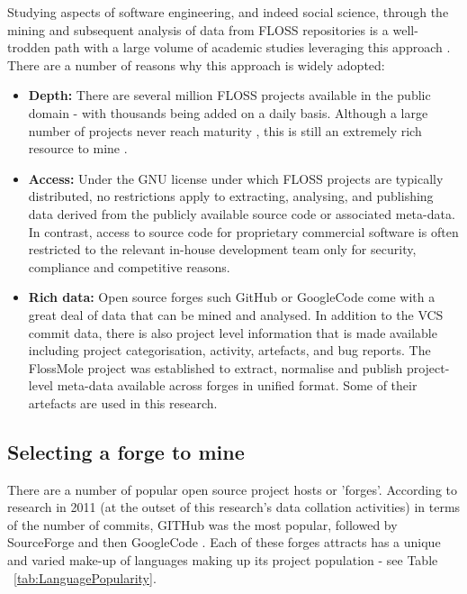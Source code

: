 Studying aspects of software engineering, and indeed social science, through the mining and subsequent analysis of data from FLOSS repositories is a well-trodden path with a large volume of academic studies leveraging this approach \citep{hassan2008road, hemmati2013msr}. There are a number of reasons why this approach is widely adopted:

\begin{itemize}
\item \textbf{Depth:} There are several million FLOSS projects available in the public domain - with thousands being added on a daily basis. Although a large number of projects never reach maturity \citep{comino2005planning}, this is still an extremely rich resource to mine \citep{deshpande2008total}.
\item \textbf{Access:} Under the GNU \citep{license2007version} license under which FLOSS projects are typically distributed, no restrictions apply to extracting, analysing, and publishing data derived from the publicly available source code or associated meta-data. In contrast, access to source code for proprietary commercial software is often restricted to the relevant in-house development team only for security, compliance and competitive reasons.
\item \textbf{Rich data:} Open source forges such GitHub \citep{github} or GoogleCode \citep{googlecode} come with a great deal of data that can be mined and analysed. In addition to the VCS commit data, there is also project level information that is made available including project categorisation, activity, artefacts, and bug reports. The FlossMole project \citep{howison2009flossmole} was established to extract, normalise and publish project-level meta-data available across forges in unified format. Some of their artefacts are used in this research.
\end{itemize}

\subsection{Selecting a forge to mine}
There are a number of popular open source project hosts or 'forges'. According to research in 2011 (at the outset of this research's data collation activities) in terms of the number of commits, GITHub was the most popular, followed by SourceForge and then GoogleCode \citep{grady2011what}. Each of these forges attracts has a unique and varied make-up of languages making up its project population - see Table ~\ref{tab:LanguagePopularity}.

